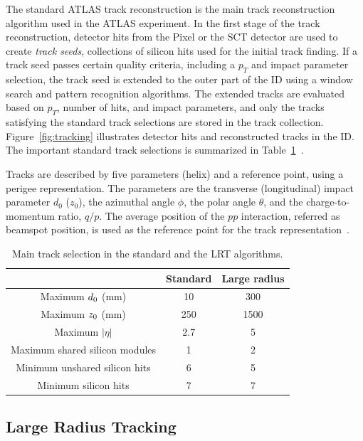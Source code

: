 The standard ATLAS track reconstruction is the main track reconstruction algorithm used in the ATLAS experiment. In the first stage of the track reconstruction, detector hits from the Pixel or the SCT detector are used to create \textit{track seeds}, collections of silicon hits used for the initial track finding. If a track seed passes certain quality criteria, including a $p_{T}$ and impact parameter selection, the track seed is extended to the outer part of the ID using a window search and pattern recognition algorithms. The extended tracks are evaluated based on $p_{T}$, number of hits, and impact parameters, and only the tracks satisfying the standard track selections are stored in the track collection. Figure~\ref{fig:tracking} illustrates detector hits and reconstructed tracks in the ID. The important standard track selections is summarized in Table~\ref{table:tracking}~\cite{ATL-PHYS-PUB-2017-014}.


Tracks are described by five parameters (helix) and a reference point, using a perigee representation. The parameters are the transverse (longitudinal) impact parameter $d_{0}$ ($z_{0}$), the azimuthal angle $\phi$, the polar angle $\theta$, and the charge-to-momentum ratio, $q/p$. The average position of the $pp$ interaction, referred as beamspot position, is used as the reference point for the track representation~\cite{Aaboud:2016rmg}.


\begin{table}[!htb]
  \centering
  \begin{tabular}{ c  c  c }
    \hline
    \hline
    & Standard & Large radius \\ [0.5ex]
    \hline
    Maximum $d_{\rm{0}}$ (mm) & 10 & 300 \\
    Maximum $z_{\rm{0}}$ (mm) & 250 & 1500 \\
    Maximum $|\eta|$ & 2.7 & 5 \\
    Maximum shared silicon modules & 1 & 2 \\
    Minimum unshared silicon hits& 6 & 5 \\
    Minimum silicon hits & 7 & 7\\
    \hline
    \hline
  \end{tabular}
  \caption{Main track selection in the standard and the LRT algorithms.}
  \label{table:tracking}
\end{table}


\subsection{Large Radius Tracking}
\label{sec:reco:lrt}

